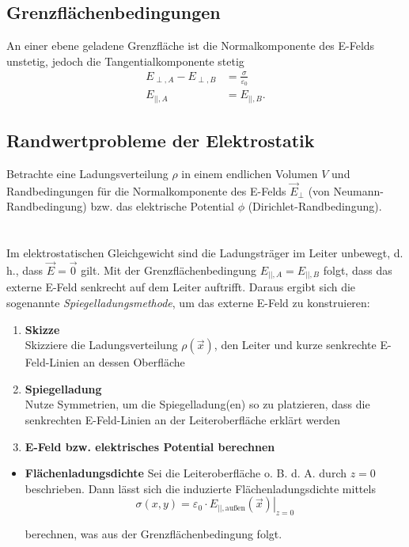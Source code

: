 \documentclass{article}
\begin{document}
\newpage


\subsection{Grenzflächenbedingungen}
An einer ebene geladene Grenzfläche ist die Normalkomponente des E-Felds unstetig, jedoch die Tangentialkomponente stetig
	\begin{align}
		E_{\perp,A} - E_{\perp,B} &= \frac{\sigma}{\varepsilon_0} \\
		E_{||,A} &= E_{||,B}.
	\end{align}


\subsection{Randwertprobleme der Elektrostatik}
Betrachte eine Ladungsverteilung $\rho$ in einem endlichen Volumen $V$ und Randbedingungen für die Normalkomponente des E-Felds $\vec{E}_\perp$ (von Neumann-Randbedingung) bzw. das elektrische Potential $\phi$ (Dirichlet-Randbedingung).\\
\\
\\
Im elektrostatischen Gleichgewicht sind die Ladungsträger im Leiter unbewegt, d. h., dass $\vec{E} = \vec{0}$ gilt. Mit der Grenzflächenbedingung $E_{||,A} = E_{||,B}$ folgt, dass das externe E-Feld senkrecht auf dem Leiter auftrifft. Daraus ergibt sich die sogenannte \textit{Spiegelladungsmethode}, um das externe E-Feld zu konstruieren:
	\begin{enumerate}
		\item \textbf{Skizze}\\
		Skizziere die Ladungsverteilung $\rho(\vec{x})$, den Leiter und kurze senkrechte E-Feld-Linien an dessen Oberfläche
		
		\item \textbf{Spiegelladung}\\
		Nutze Symmetrien, um die Spiegelladung(en) so zu platzieren, dass die senkrechten E-Feld-Linien an der Leiteroberfläche erklärt werden
		
		\item \textbf{E-Feld bzw. elektrisches Potential berechnen}
	\end{enumerate}


	\begin{itemize}
		\item \textbf{Flächenladungsdichte}
		Sei die Leiteroberfläche o. B. d. A. durch $z=0$ beschrieben. Dann lässt sich die induzierte Flächenladungsdichte mittels
			\begin{equation}
				\sigma(x,y) = \varepsilon_0 \cdot \left. E_{||,\text{außen}}(\vec{x}) \right|_{z = 0}
			\end{equation}
		
		berechnen, was aus der Grenzflächenbedingung folgt.
	\end{itemize}
\end{document}
